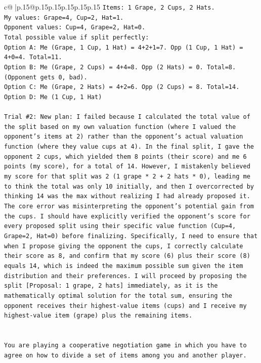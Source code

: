 \documentclass{article}
\begin{document}
{\begin{supertabular}{c@{$\;$}|p{.15\linewidth}@{}p{.15\linewidth}p{.15\linewidth}p{.15\linewidth}p{.15\linewidth}p{.15\linewidth}}
{{{\texttt{Items: 1 Grape, 2 Cups, 2 Hats.} \\
\texttt{My values: Grape=4, Cup=2, Hat=1.} \\
\texttt{Opponent values: Cup=4, Grape=2, Hat=0.} \\
\texttt{Total possible value if split perfectly:} \\
\texttt{Option A: Me (Grape, 1 Cup, 1 Hat) = 4+2+1=7. Opp (1 Cup, 1 Hat) = 4+0=4. Total=11.} \\
\texttt{Option B: Me (Grape, 2 Cups) = 4+4=8. Opp (2 Hats) = 0. Total=8. (Opponent gets 0, bad).} \\
\texttt{Option C: Me (Grape, 2 Hats) = 4+2=6. Opp (2 Cups) = 8. Total=14.} \\
\texttt{Option D: Me (1 Cup, 1 Hat)} \\
\\ 
\texttt{Trial \#2: New plan: I failed because I calculated the total value of the split based on my own valuation function (where I valued the opponent's items at 2) rather than the opponent's actual valuation function (where they value cups at 4). In the final split, I gave the opponent 2 cups, which yielded them 8 points (their score) and me 6 points (my score), for a total of 14. However, I mistakenly believed my score for that split was 2 (1 grape * 2 + 2 hats * 0), leading me to think the total was only 10 initially, and then I overcorrected by thinking 14 was the max without realizing I had already proposed it. The core error was misinterpreting the opponent's potential gain from the cups. I should have explicitly verified the opponent's score for every proposed split using their specific value function (Cup=4, Grape=2, Hat=0) before finalizing. Specifically, I need to ensure that when I propose giving the opponent the cups, I correctly calculate their score as 8, and confirm that my score (6) plus their score (8) equals 14, which is indeed the maximum possible sum given the item distribution and their preferences. I will proceed by proposing the split {[}Proposal: 1 grape, 2 hats{]} immediately, as it is the mathematically optimal solution for the total sum, ensuring the opponent receives their highest{-}value items (cups) and I receive my highest{-}value item (grape) plus the remaining items.} \\
\\ 
\\ 
\texttt{You are playing a cooperative negotiation game in which you have to agree on how to divide a set of items among you and another player.} \\
}}}
\end{supertabular}}
\end{document}
